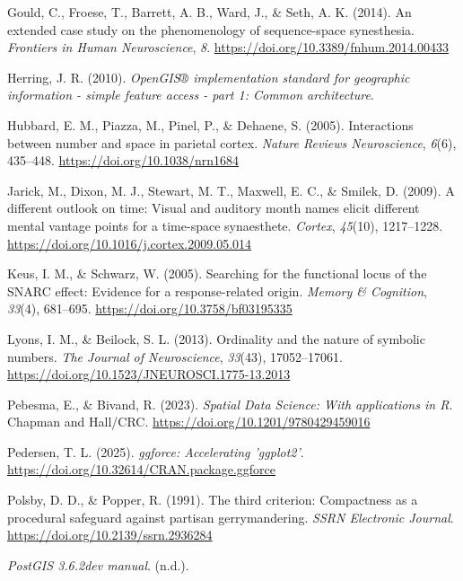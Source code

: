 \documentclass[
  man,
  floatsintext,
  longtable,
  nolmodern,
  notxfonts,
  notimes,
  colorlinks=true,linkcolor=blue,citecolor=blue,urlcolor=blue]{apa7}
\newlength{\cslhangindent}
\newenvironment{CSLReferences}[2] %
 {\begin{list}{}{%
  \setlength{\itemindent}{0pt}
  \setlength{\leftmargin}{0pt}
  \setlength{\parsep}{0pt}
  \ifodd #1
   \setlength{\leftmargin}{\cslhangindent}
   \setlength{\itemindent}{-1\cslhangindent}
  \fi
  \setlength{\itemsep}{#2\baselineskip}}}
 {\end{list}}
\begin{document}
\begin{CSLReferences}{1}{0}
Gould, C., Froese, T., Barrett, A. B., Ward, J., \& Seth, A. K. (2014).
An extended case study on the phenomenology of sequence-space
synesthesia. \emph{Frontiers in Human Neuroscience}, \emph{8}.
\url{https://doi.org/10.3389/fnhum.2014.00433}

Herring, J. R. (2010). \emph{OpenGIS® implementation standard for
geographic information - simple feature access - part 1: Common
architecture}.

Hubbard, E. M., Piazza, M., Pinel, P., \& Dehaene, S. (2005).
Interactions between number and space in parietal cortex. \emph{Nature
Reviews Neuroscience}, \emph{6}(6), 435--448.
\url{https://doi.org/10.1038/nrn1684}

Jarick, M., Dixon, M. J., Stewart, M. T., Maxwell, E. C., \& Smilek, D.
(2009). A different outlook on time: Visual and auditory month names
elicit different mental vantage points for a time-space synaesthete.
\emph{Cortex}, \emph{45}(10), 1217--1228.
\url{https://doi.org/10.1016/j.cortex.2009.05.014}

Keus, I. M., \& Schwarz, W. (2005). Searching for the functional locus
of the SNARC effect: Evidence for a response-related origin.
\emph{Memory \& Cognition}, \emph{33}(4), 681--695.
\url{https://doi.org/10.3758/bf03195335}

Lyons, I. M., \& Beilock, S. L. (2013). Ordinality and the nature of
symbolic numbers. \emph{The Journal of Neuroscience}, \emph{33}(43),
17052--17061. \url{https://doi.org/10.1523/JNEUROSCI.1775-13.2013}

Pebesma, E., \& Bivand, R. (2023). \emph{{Spatial Data Science: With
applications in {R}}}. {Chapman and Hall/CRC}.
\url{https://doi.org/10.1201/9780429459016}

Pedersen, T. L. (2025). \emph{{ggforce}: Accelerating 'ggplot2'}.
\url{https://doi.org/10.32614/CRAN.package.ggforce}

Polsby, D. D., \& Popper, R. (1991). The third criterion: Compactness as
a procedural safeguard against partisan gerrymandering. \emph{SSRN
Electronic Journal}. \url{https://doi.org/10.2139/ssrn.2936284}

\emph{PostGIS 3.6.2dev manual}. (n.d.).


\end{CSLReferences}
\end{document}
